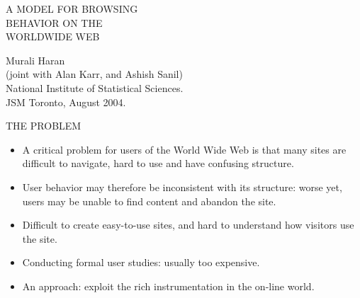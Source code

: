 \documentclass{report}
\newcommand{\head}[1]
{
  \begin{center}
      {\huge {\color{blue} #1}}
    \end{center}
  }
\begin{document}
\thispagestyle{empty}
\pagestyle{plain}
\phantom{Blah blah blah\\}
\phantom{Blah blah blah\\}
\phantom{Blah blah blah\\}
\phantom{Blah blah blah\\}
\phantom{Blah blah blah\\}
\Huge
\begin{center}
A MODEL FOR BROWSING\\
BEHAVIOR ON THE \\
WORLDWIDE WEB
\end{center}
\huge
\phantom{Blah blah blah\\}
\begin{center}
Murali Haran\\
(joint with Alan Karr, and Ashish Sanil)\\
National Institute of Statistical Sciences.\\
\LARGE JSM Toronto, August 2004.
\end{center}
\newpage \head{THE PROBLEM}
\begin{itemize}
\item A critical problem for users of the World Wide Web is that many
  sites are difficult to navigate, hard to use and have confusing
  structure.
\item User behavior may therefore be inconsistent with its structure:
  worse yet, users may be unable to find content and abandon the site.
\item Difficult to create easy-to-use sites, and hard to understand how visitors use the site.
\item Conducting formal user studies: usually too expensive.
\item An approach: exploit the rich instrumentation in the
  on-line world.
\end{itemize}
\end{document}
